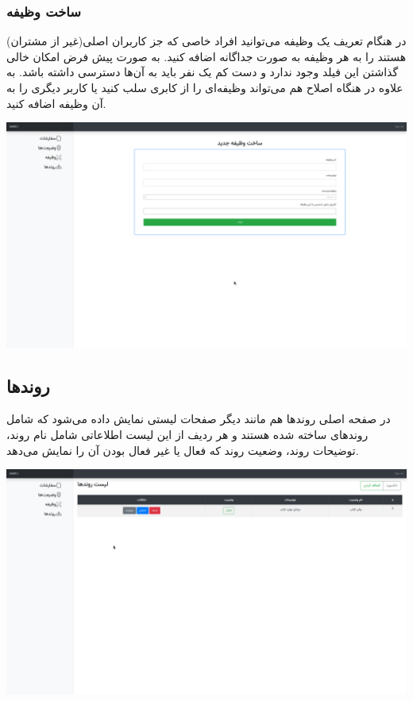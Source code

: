 \documentclass[a4paper]{article}
\begin{document}
\subsubsection{ساخت وظیفه}
\label{sec:org430605a}
در هنگام تعریف یک وظیفه می‌توانید افراد خاصی که جز کاربران اصلی(غیر از مشتران) هستند را به هر وظیفه به صورت جداگانه اضافه کنید. به صورت پیش فرض امکان خالی گذاشتن این فیلد وجود ندارد و دست کم یک نفر باید به آن‌ها دسترسی داشته باشد. به علاوه در هنگاه اصلاح هم می‌تواند وظیفه‌ای را از کابری سلب کنید یا کاربر دیگری را به آن وظیفه اضافه کنید.

\begin{center}
\includegraphics[width=.9\linewidth]{./img/create-action.png}
\end{center}

\subsection{روندها}
\label{sec:org59e1b3c}
در صفحه اصلی روندها هم مانند دیگر صفحات لیستی نمایش داده می‌شود که شامل روندهای ساخته شده هستند و هر ردیف از این لیست اطلاعاتی شامل نام روند، توضیحات روند، وضعیت روند که فعال یا غیر فعال بودن آن را نمایش می‌دهد.

\begin{center}
\includegraphics[width=.9\linewidth]{./img/process.png}
\end{center}
\end{document}
